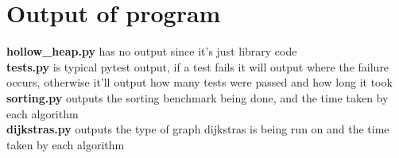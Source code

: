 \documentclass[10pt]{article}
\begin{document}
\section*{Output of program}
\textbf{hollow\_heap.py} has no output since it's just library code\\
\textbf{tests.py} is typical pytest output, if a test fails it will output where the failure occurs, otherwise it'll output how many tests were passed and how long it took\\
\textbf{sorting.py} outputs the sorting benchmark being done, and the time taken by each algorithm\\
\textbf{dijkstras.py} outputs the type of graph dijkstras is being run on and the time taken by each algorithm\\


{}

\end{document}
